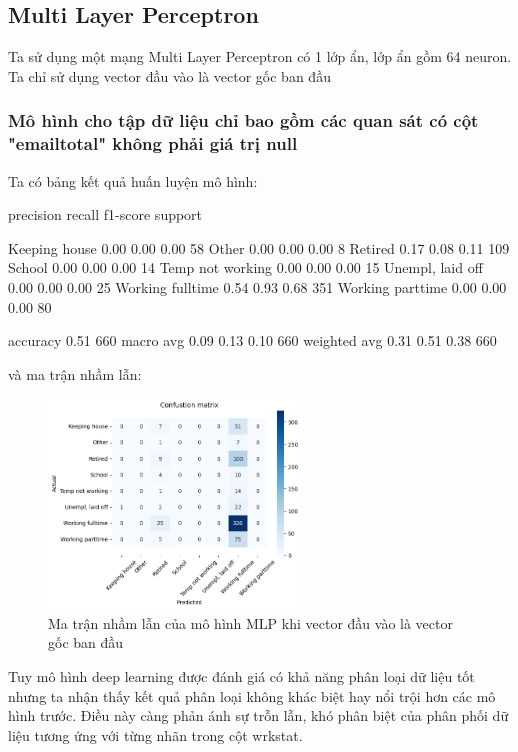 \subsection{Multi Layer Perceptron}

Ta sử dụng một mạng Multi Layer Perceptron có 1 lớp ẩn, lớp ẩn gồm 64 neuron.
Ta chỉ sử dụng vector đầu vào là vector gốc ban đầu

\subsubsection{Mô hình cho tập dữ liệu chỉ bao gồm các quan sát có cột "emailtotal" không phải giá trị null}

Ta có bảng kết quả huấn luyện mô hình:

\begin{python}
                    precision    recall  f1-score   support

   Keeping house       0.00      0.00      0.00        58
           Other       0.00      0.00      0.00         8
         Retired       0.17      0.08      0.11       109
          School       0.00      0.00      0.00        14
Temp not working       0.00      0.00      0.00        15
Unempl, laid off       0.00      0.00      0.00        25
Working fulltime       0.54      0.93      0.68       351
Working parttime       0.00      0.00      0.00        80

        accuracy                           0.51       660
       macro avg       0.09      0.13      0.10       660
    weighted avg       0.31      0.51      0.38       660
\end{python}

và ma trận nhầm lẫn:

\begin{figure}[H]
    \centering
    \includegraphics[width=0.6\textwidth]{figures/Thanh/Models/MLP_Deep_Learning/Non_null_models_confusion_matrix_MLP_original_features.png}
    \caption{Ma trận nhầm lẫn của mô hình MLP khi vector đầu vào là vector gốc ban đầu}
    \label{fig:Non_null_models_confusion_matrix_MLP_original_features}
\end{figure}

Tuy mô hình deep learning được đánh giá có khả năng phân loại dữ liệu tốt nhưng ta nhận thấy kết quả phân loại không khác biệt hay nổi trội hơn các mô hình trước.
Điều này càng phản ánh sự trỗn lẫn, khó phân biệt của phân phối dữ liệu tương ứng với từng nhãn trong cột wrkstat.